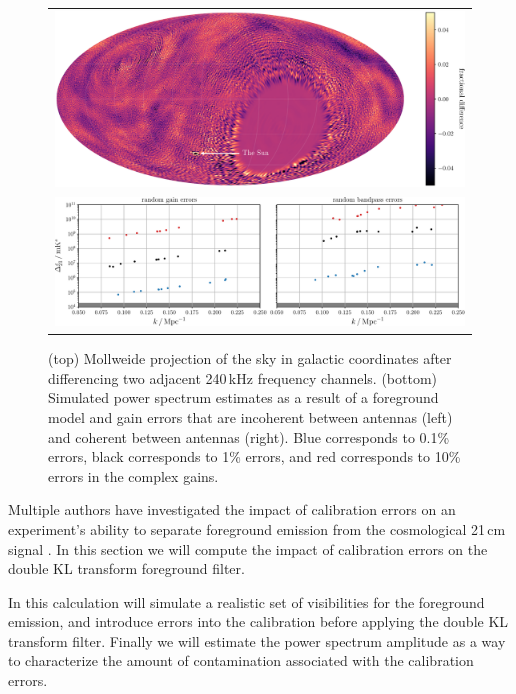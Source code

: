 \begin{bibunit}
\begin{figure}
    \centering
    \begin{tabular}{c}
        \includegraphics[width=\textwidth]{figures/chapter4/channel-difference-sky-map-colorbar}\\
        \includegraphics[width=\textwidth]{figures/chapter4/spherical-power-spectrum-gain-errors}\\
    \end{tabular}
    \caption{
        (top) Mollweide projection of the sky in galactic coordinates after differencing two
        adjacent 240\,kHz frequency channels.
        (bottom) Simulated power spectrum estimates as a result of a foreground model and gain
        errors that are incoherent between antennas (left) and coherent between antennas (right).
        Blue corresponds to 0.1\% errors, black corresponds to 1\% errors, and red corresponds to
        10\% errors in the complex gains.
    }
    \label{fig:spherical-power-spectrum-gain-errors}
\end{figure}

Multiple authors have investigated the impact of calibration errors on an experiment's ability to
separate foreground emission from the cosmological 21\,cm signal \citep{2016MNRAS.461.3135B,
2017MNRAS.470.1849E}. In this section we will compute the impact of calibration errors on the double
KL transform foreground filter.

In this calculation will simulate a realistic set of visibilities for the foreground emission, and
introduce errors into the calibration before applying the double KL transform filter. Finally we
will estimate the power spectrum amplitude as a way to characterize the amount of contamination
associated with the calibration errors.


\end{bibunit}
